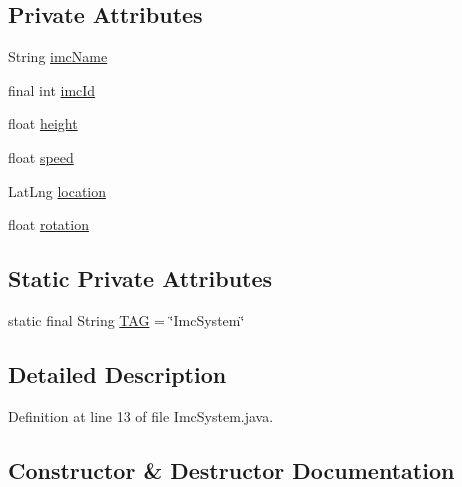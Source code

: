 \subsection*{Private Attributes}
\begin{DoxyCompactItemize}
\item 
String \hyperlink{classpt_1_1lsts_1_1asa_1_1comms_1_1ImcSystem_a035749ded821f7a8095f7174b74c904e}{imc\+Name}
\item 
final int \hyperlink{classpt_1_1lsts_1_1asa_1_1comms_1_1ImcSystem_ac42b6810c36514facda51cc0cf42d343}{imc\+Id}
\item 
float \hyperlink{classpt_1_1lsts_1_1asa_1_1comms_1_1ImcSystem_afcbb198ac569fb1ae5de4a1809bed10c}{height}
\item 
float \hyperlink{classpt_1_1lsts_1_1asa_1_1comms_1_1ImcSystem_a425d911ad6689aef73a9103ca5621db6}{speed}
\item 
Lat\+Lng \hyperlink{classpt_1_1lsts_1_1asa_1_1comms_1_1ImcSystem_ae9e9619bacd8538ef96630499c51e762}{location}
\item 
float \hyperlink{classpt_1_1lsts_1_1asa_1_1comms_1_1ImcSystem_a30a763c50ea85e886d882aba0efd9025}{rotation}
\end{DoxyCompactItemize}
\subsection*{Static Private Attributes}
\begin{DoxyCompactItemize}
\item 
static final String \hyperlink{classpt_1_1lsts_1_1asa_1_1comms_1_1ImcSystem_a1349eeeaa351e92843c1618d4f0ac5e6}{T\+A\+G} = \char`\"{}Imc\+System\char`\"{}
\end{DoxyCompactItemize}


\subsection{Detailed Description}


Definition at line 13 of file Imc\+System.\+java.



\subsection{Constructor \& Destructor Documentation}
\hypertarget{classpt_1_1lsts_1_1asa_1_1comms_1_1ImcSystem_ae85090f9cfbda5d421fa44685582876c}{}
